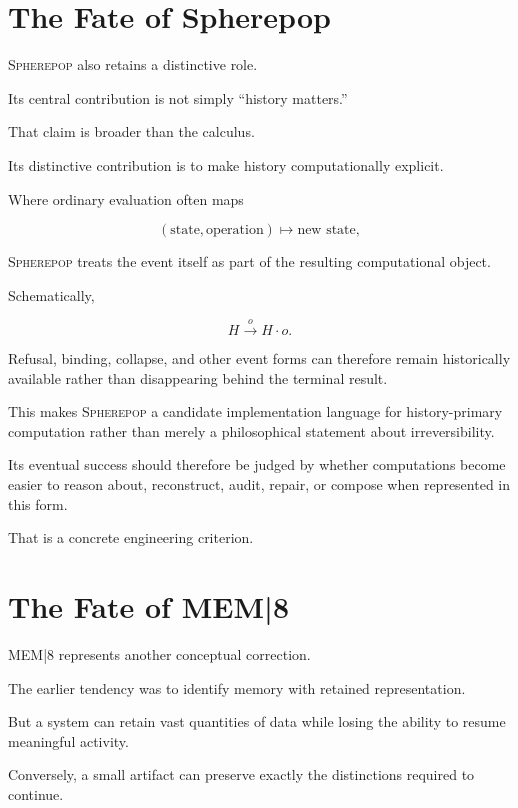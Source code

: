 \documentclass[11pt]{article}
\theoremstyle{remark}
\newcommand{\MEM}{\textsc{MEM|8}}
\newcommand{\Spherepop}{\textsc{Spherepop}}
\begin{document}
\section{The Fate of Spherepop}

\Spherepop{} also retains a distinctive role.

Its central contribution is not simply ``history matters.''

That claim is broader than the calculus.

Its distinctive contribution is to make history computationally explicit.

Where ordinary evaluation often maps

\begin{equation}
(\text{state},\text{operation})
\mapsto
\text{new state},
\end{equation}

\Spherepop{} treats the event itself as part of the resulting computational object.

Schematically,

\begin{equation}
H
\xrightarrow{o}
H\cdot o.
\end{equation}

Refusal, binding, collapse, and other event forms can therefore remain historically available rather than disappearing behind the terminal result.

This makes \Spherepop{} a candidate implementation language for history-primary computation rather than merely a philosophical statement about irreversibility.

Its eventual success should therefore be judged by whether computations become easier to reason about, reconstruct, audit, repair, or compose when represented in this form.

That is a concrete engineering criterion.

\section{The Fate of MEM|8}

\MEM{} represents another conceptual correction.

The earlier tendency was to identify memory with retained representation.

But a system can retain vast quantities of data while losing the ability to resume meaningful activity.

Conversely, a small artifact can preserve exactly the distinctions required to continue.
\end{document}
